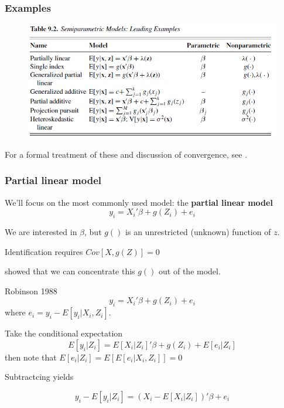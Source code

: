 \begin{frame}
  \frametitle{Examples}
  
  \begin{figure}[htbp]
    \begin{center}
    \includegraphics[width=\textwidth]{./resources/CTSemiPExamples}
    \label{loclinear2}
    \end{center}
  \end{figure}

  For a formal treatment of these and discussion of convergence, see \cite{powell_chapter_1994}.
\end{frame}

\begin{frame}
  \frametitle{Partial linear model}
  We'll focus on the most commonly used model: the \textbf{partial linear model} 
  $$ y_i = X_i'\beta + g(Z_i) + e_i $$ 
  
  We are interested in $\beta$, but $g()$ is an unrestricted (unknown) function of $z$. 

  Identification requires $Cov[X,g(Z)]=0$ 

  \citet{robinson_root-n-consistent_1988} showed that we can concentrate this $g()$ out of the model. 

\end{frame}

\begin{frame}{Robinson 1988}
  \vspace{-10pt}
  $$ y_i = X_i'\beta + g(Z_i) + e_i $$ 
  where $e_i = y_i - E[y_i | X_i,Z_i]$. 
  
  \pause 
  \vspace{10pt}
  Take the conditional expectation
  $$ E[y_i | Z_i]  = E [X_i | Z_i]'\beta + g(Z_i) + E[e_i | Z_i] $$ 
  then note that $E[e_i | Z_i] = E[E[e_i | X_i,Z_i]] = 0$ 
  
 \pause 
 \vspace{10pt}
  Subtractcing yields 

  $$ y_i - E[y_i | Z_i] = (X_i - E [X_i | Z_i])'\beta + e_i $$

\end{frame}

